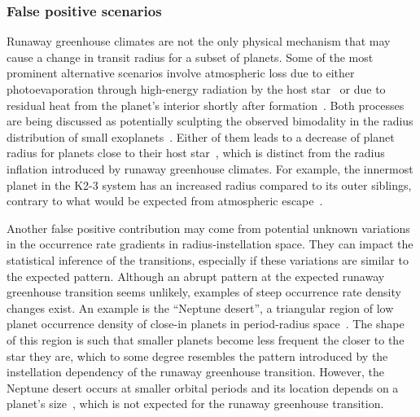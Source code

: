\documentclass[twocolumn,twocolappendix]{aastex631}
\begin{document}
\subsubsection{False positive scenarios}\label{sec:dis_falsepositive}
Runaway greenhouse climates are not the only physical mechanism that may cause a change in transit radius for a subset of planets.
Some of the most prominent alternative scenarios involve atmospheric loss due to either photoevaporation through high-energy radiation by the host star~\citep[e.g.,][]{2012ApJ...753...66I,Owen2013,Jin2014,Mordasini2020a} or due to residual heat from the planet's interior shortly after formation~\citep{Ginzburg2016b,Ginzburg2018,Gupta2019}.
Both processes are being discussed as potentially sculpting the observed bimodality in the radius distribution of small exoplanets~\citep{Fulton2017,VanEylen2018}.
Either of them leads to a decrease of planet radius for planets close to their host star~\citep{Pascucci2019,Bergsten2022}, which is distinct from the radius inflation introduced by runaway greenhouse climates.
For example, the innermost planet in the \mbox{K2-3} system has an increased radius compared to its outer siblings, contrary to what would be expected from atmospheric escape~\citep{2022AJ....164..172D}.

Another false positive contribution may come from potential unknown variations in the occurrence rate gradients in radius-instellation space.
They can impact the statistical inference of the transitions, especially if these variations are similar to the expected pattern.
Although an abrupt pattern at the expected runaway greenhouse transition seems unlikely, examples of steep occurrence rate density changes exist.
An example is the ``Neptune desert'', a triangular region of low planet occurrence density of close-in planets in period-radius space~\citep{Szabo2011,Mazeh2016,Dreizler2020b}.
The shape of this region is such that smaller planets become less frequent the closer to the star they are, which to some degree resembles the pattern introduced by the instellation dependency of the runaway greenhouse transition.
However, the Neptune desert occurs at smaller orbital periods and its location depends on a planet's size~\citep{Szabo2011}, which is not expected for the runaway greenhouse transition.
\end{document}
